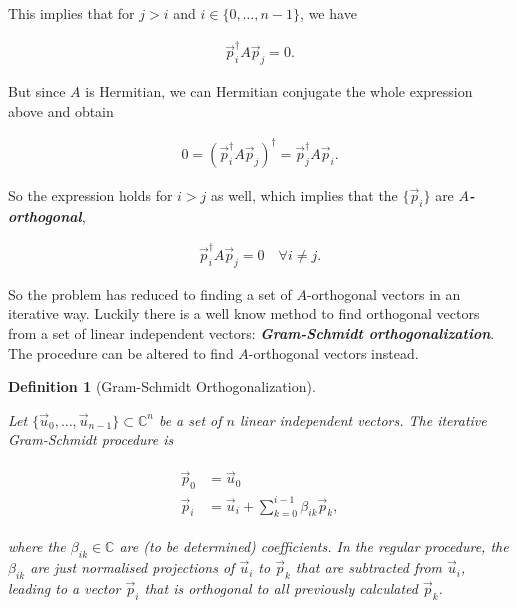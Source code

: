 \documentclass{article}
\theoremstyle{plain} %
\newtheorem{definition}{Definition}[section]
\theoremstyle{convention} %
\theoremstyle{remark} %
\def\df#1{\textbf{\textit{#1}}}
\numberwithin{equation}{section}
\begin{document}
This implies that for $j>i$ and $i \in \{0, \dots, n-1\}$, we have

\begin{align*}
    \vec{p}_i^{\dagger} A \vec{p}_j = 0.
\end{align*}

But since $A$ is Hermitian, we can Hermitian conjugate the whole expression above and obtain

\begin{align*}
    0 = \left( \vec{p}_i^{\dagger} A \vec{p}_j \right)^{\dagger} = \vec{p}_j^{\dagger} A \vec{p}_i.
\end{align*}

So the expression holds for $i>j$ as well, which implies that the $\{\vec{p}_i\}$ are \df{$A$-orthogonal},

\begin{align*}
    \vec{p}_i^{\dagger} A \vec{p}_j = 0 \quad \forall i \neq j.
\end{align*}

So the problem has reduced to finding a set of $A$-orthogonal vectors in an iterative way. Luckily there is a well know method to find orthogonal vectors from a set of linear independent vectors: \df{Gram-Schmidt orthogonalization}. The procedure can be altered to find $A$-orthogonal vectors instead.

\begin{definition}[Gram-Schmidt Orthogonalization]

\label{df:gramschmidt}

Let $\{ \vec{u}_0, \dots, \vec{u}_{n-1} \} \subset \mathbb{C}^n$ be a set of $n$ linear independent vectors. The iterative Gram-Schmidt procedure is

\begin{align}
    \begin{split}
        \vec{p}_0 &= \vec{u}_0 \label{eq:gramschmidt} \\
        \vec{p}_i &= \vec{u}_i + \sum_{k=0}^{i-1} \beta_{ik} \vec{p}_k,
    \end{split}
\end{align}

where the $\beta_{ik} \in \mathbb{C}$ are (to be determined) coefficients. In the regular procedure, the $\beta_{ik}$ are just normalised projections of $\vec{u}_i$ to $\vec{p}_k$ that are subtracted from $\vec{u}_i$, leading to a vector $\vec{p}_i$ that is orthogonal to all previously calculated $\vec{p}_k$.

\end{definition}
\end{document}
